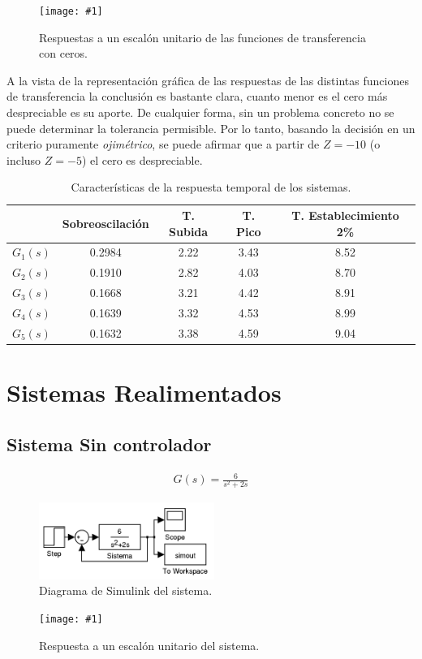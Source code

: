 \documentclass[paper=a4, fontsize=11pt]{scrreprt} %
\newlength{\imgwidth}
\newcommand\scalegraphics[1]{
    \settowidth{\imgwidth}{\texttt{[image: \#1]}}
    \setlength{\imgwidth}{\minof{\imgwidth}{\textwidth}}
    \texttt{[image: \#1]}
}
\numberwithin{equation}{section} %
\numberwithin{figure}{section} %
\numberwithin{table}{section} %
\begin{document}
    
    \begin{figure}[H]
        \centering
        \scalegraphics{imagenes/respuestas/funciones_de_transferencia_con_ceros_respuesta_step.png}
        \caption{Respuestas a un escalón unitario de las funciones de transferencia con ceros.}
    \end{figure}
    A la vista de la representación gráfica de las respuestas de las distintas funciones de transferencia la conclusión es bastante clara, cuanto menor es el cero más despreciable es su aporte. De cualquier forma, sin un problema concreto no se puede determinar la tolerancia permisible. Por lo tanto, basando la decisión en un criterio puramente \emph{ojimétrico}, se puede afirmar que a partir de $Z = -10$ (o incluso $Z = -5$) el cero es despreciable.
    \begin{table}
        \centering
        \begin{tabular}{|c||c|c|c|c|}
            \hline
            & Sobreoscilación & T. Subida & T. Pico & T. Establecimiento 2\% \\
            \hline
            $G_1(s)$ & 0.2984 & 2.22 & 3.43 & 8.52 \\
            \hline
            $G_2(s)$ & 0.1910 & 2.82 & 4.03 & 8.70 \\
            \hline
            $G_3(s)$ & 0.1668 & 3.21 & 4.42 & 8.91 \\
            \hline
            $G_4(s)$ & 0.1639 & 3.32 & 4.53 & 8.99 \\
            \hline
            $G_5(s)$ & 0.1632 & 3.38 & 4.59 & 9.04 \\
            \hline
        \end{tabular}
        \caption{Características de la respuesta temporal de los sistemas.}
    \end{table}
    \newpage
    \chapter{Sistemas Realimentados}
    \section{Sistema Sin controlador}
    \begin{align}
        G(s) = \frac{6}{s^2 + 2s}
    \end{align}
    \begin{figure}[H]
        \centering
        \includegraphics[height = 2.5cm]{imagenes/simulink/simulink_sistema_realimentado_sin_controlador.png}
        \caption{Diagrama de Simulink del sistema.}
    \end{figure}
    \begin{figure}[H]
        \centering
        \scalegraphics{imagenes/respuestas/sin_controlador_respuesta_escalon.png}
        \caption{Respuesta a un escalón unitario del sistema.}
    \end{figure}
    
\end{document}
